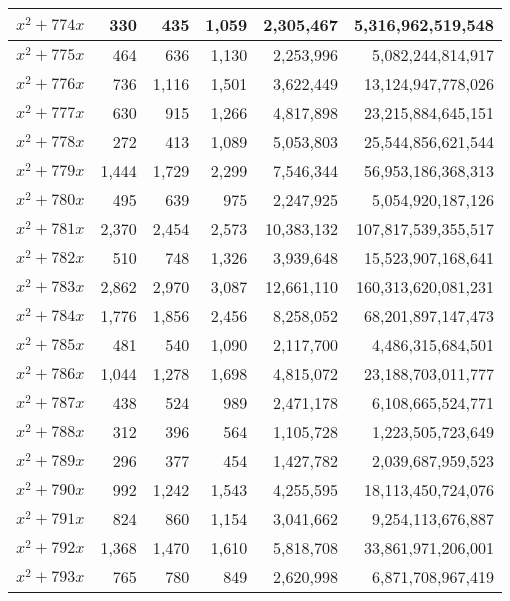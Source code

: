 \documentclass[a4paper]{amsproc}
\theoremstyle{plain}
\begin{document}
\begin{longtable}{ | l | r | r | r | r | r | }
$x^2 + 774x$ & 330 & 435 & 1{,}059 & 2{,}305{,}467 & 5{,}316{,}962{,}519{,}548 \\ \hline
$x^2 + 775x$ & 464 & 636 & 1{,}130 & 2{,}253{,}996 & 5{,}082{,}244{,}814{,}917 \\ \hline
$x^2 + 776x$ & 736 & 1{,}116 & 1{,}501 & 3{,}622{,}449 & 13{,}124{,}947{,}778{,}026 \\ \hline
$x^2 + 777x$ & 630 & 915 & 1{,}266 & 4{,}817{,}898 & 23{,}215{,}884{,}645{,}151 \\ \hline
$x^2 + 778x$ & 272 & 413 & 1{,}089 & 5{,}053{,}803 & 25{,}544{,}856{,}621{,}544 \\ \hline
$x^2 + 779x$ & 1{,}444 & 1{,}729 & 2{,}299 & 7{,}546{,}344 & 56{,}953{,}186{,}368{,}313 \\ \hline
$x^2 + 780x$ & 495 & 639 & 975 & 2{,}247{,}925 & 5{,}054{,}920{,}187{,}126 \\ \hline
$x^2 + 781x$ & 2{,}370 & 2{,}454 & 2{,}573 & 10{,}383{,}132 & 107{,}817{,}539{,}355{,}517 \\ \hline
$x^2 + 782x$ & 510 & 748 & 1{,}326 & 3{,}939{,}648 & 15{,}523{,}907{,}168{,}641 \\ \hline
$x^2 + 783x$ & 2{,}862 & 2{,}970 & 3{,}087 & 12{,}661{,}110 & 160{,}313{,}620{,}081{,}231 \\ \hline
$x^2 + 784x$ & 1{,}776 & 1{,}856 & 2{,}456 & 8{,}258{,}052 & 68{,}201{,}897{,}147{,}473 \\ \hline
$x^2 + 785x$ & 481 & 540 & 1{,}090 & 2{,}117{,}700 & 4{,}486{,}315{,}684{,}501 \\ \hline
$x^2 + 786x$ & 1{,}044 & 1{,}278 & 1{,}698 & 4{,}815{,}072 & 23{,}188{,}703{,}011{,}777 \\ \hline
$x^2 + 787x$ & 438 & 524 & 989 & 2{,}471{,}178 & 6{,}108{,}665{,}524{,}771 \\ \hline
$x^2 + 788x$ & 312 & 396 & 564 & 1{,}105{,}728 & 1{,}223{,}505{,}723{,}649 \\ \hline
$x^2 + 789x$ & 296 & 377 & 454 & 1{,}427{,}782 & 2{,}039{,}687{,}959{,}523 \\ \hline
$x^2 + 790x$ & 992 & 1{,}242 & 1{,}543 & 4{,}255{,}595 & 18{,}113{,}450{,}724{,}076 \\ \hline
$x^2 + 791x$ & 824 & 860 & 1{,}154 & 3{,}041{,}662 & 9{,}254{,}113{,}676{,}887 \\ \hline
$x^2 + 792x$ & 1{,}368 & 1{,}470 & 1{,}610 & 5{,}818{,}708 & 33{,}861{,}971{,}206{,}001 \\ \hline
$x^2 + 793x$ & 765 & 780 & 849 & 2{,}620{,}998 & 6{,}871{,}708{,}967{,}419 \\ \hline

\end{longtable}
\end{document}
